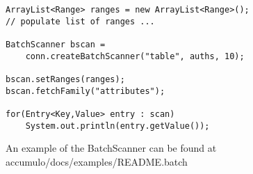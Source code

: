 \small
\begin{verbatim}
ArrayList<Range> ranges = new ArrayList<Range>();
// populate list of ranges ...

BatchScanner bscan =
    conn.createBatchScanner("table", auths, 10);

bscan.setRanges(ranges);
bscan.fetchFamily("attributes");

for(Entry<Key,Value> entry : scan)
    System.out.println(entry.getValue());
\end{verbatim}
\normalsize

An example of the BatchScanner can be found at\\
accumulo/docs/examples/README.batch

